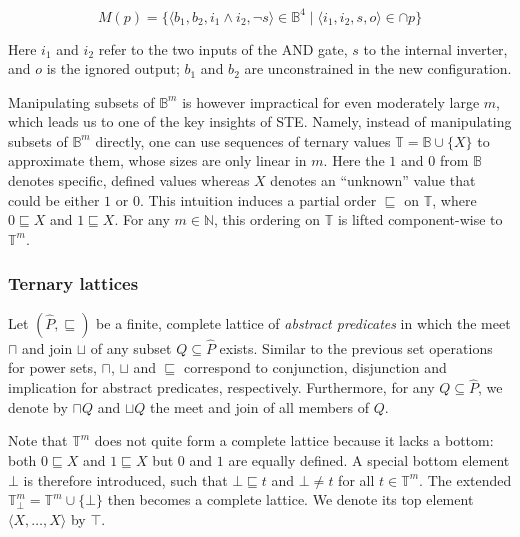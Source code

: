 \begin{equation*}
M(p) = \{ \langle b_{1}, b_{2}, i_{1} \wedge i_{2}, \neg s \rangle \in \mathbb{B}^{4} \mid \langle i_{1}, i_{2}, s, o \rangle \in \cap p \}
\end{equation*}

\noindent Here $i_{1}$ and $i_{2}$ refer to the two inputs of the AND gate, $s$ to the internal inverter, and $o$ is the ignored output; $b_{1}$ and $b_{2}$ are unconstrained in the new configuration.

Manipulating subsets of $\mathbb{B}^{m}$ is however impractical for even moderately large $m$, which leads us to one of the key insights of STE. Namely, instead of manipulating subsets of $\mathbb{B}^{m}$ directly, one can use sequences of ternary values $\mathbb{T} = \mathbb{B} \cup \{ X \} $ to approximate them, whose sizes are only linear in $m$. Here the $1$ and $0$ from $\mathbb{B}$ denotes specific, defined values whereas $X$ denotes an ``unknown'' value that could be either $1$ or $0$. This intuition induces a partial order $\sqsubseteq$ on $\mathbb{T}$, where $0 \sqsubseteq X$ and $1 \sqsubseteq X$\footnotemark. For any $m \in \mathbb{N}$, this ordering on $\mathbb{T}$ is lifted component-wise to $\mathbb{T}^{m}$.


\subsubsection{Ternary lattices}

Let $(\hat P,\sqsubseteq)$ be a finite, complete lattice of \textit{abstract predicates} in which the meet $\sqcap$ and join $\sqcup$ of any subset $Q \subseteq \hat P$ exists. Similar to the previous set operations for power sets, $\sqcap$, $\sqcup$ and $\sqsubseteq$ correspond to conjunction, disjunction and implication for abstract predicates, respectively. Furthermore, for any $Q \subseteq \hat P$, we denote by $\sqcap Q$ and $\sqcup Q$ the meet and join of all members of $Q$. 

Note that $\mathbb{T}^{m}$ does not quite form a complete lattice because it lacks a bottom: both $0 \sqsubseteq X$ and $1 \sqsubseteq X$ but $0$ and $1$ are equally defined. A special bottom element $\bot$ is therefore introduced, such that $\bot \sqsubseteq t$ and $\bot \neq t$ for all $t \in \mathbb{T}^{m}$. The extended $\mathbb{T}_{\bot}^{m} = \mathbb{T}^{m} \cup \{ \bot \}$ then becomes a complete lattice. We denote its top element $\langle X, \dots, X \rangle$ by $\top$.

